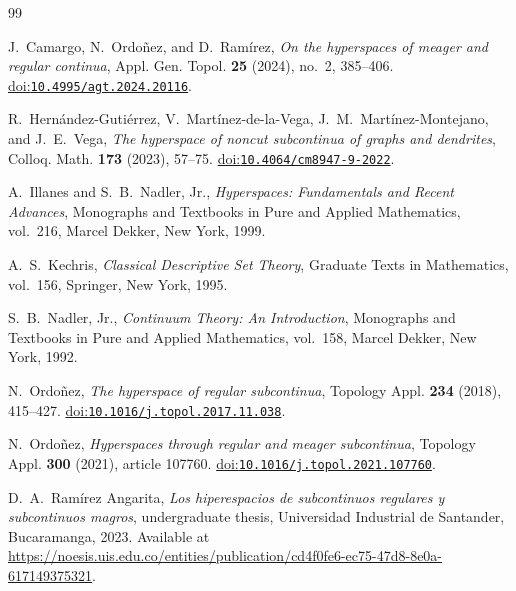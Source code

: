 \documentclass[11pt]{amsart}
\theoremstyle{definition}
\theoremstyle{remark}
\newcommand{\doi}[1]{\href{https://doi.org/#1}{doi:\nolinkurl{#1}}}
\begin{document}
\begin{thebibliography}{99}

J.~Camargo, N.~Ordo\~nez, and D.~Ram\'irez,
\emph{On the hyperspaces of meager and regular continua},
Appl. Gen. Topol. \textbf{25} (2024), no.~2, 385--406.
\doi{10.4995/agt.2024.20116}.

R.~Hern\'andez-Guti\'errez, V.~Mart\'inez-de-la-Vega, J.~M.~Mart\'inez-Montejano, and J.~E.~Vega,
\emph{The hyperspace of noncut subcontinua of graphs and dendrites},
Colloq. Math. \textbf{173} (2023), 57--75.
\doi{10.4064/cm8947-9-2022}.

A.~Illanes and S.~B.~Nadler, Jr.,
\emph{Hyperspaces: Fundamentals and Recent Advances},
Monographs and Textbooks in Pure and Applied Mathematics, vol.~216,
Marcel Dekker, New York, 1999.

A.~S.~Kechris,
\emph{Classical Descriptive Set Theory},
Graduate Texts in Mathematics, vol.~156, Springer, New York, 1995.

S.~B.~Nadler, Jr.,
\emph{Continuum Theory: An Introduction},
Monographs and Textbooks in Pure and Applied Mathematics, vol.~158,
Marcel Dekker, New York, 1992.

N.~Ordo\~nez,
\emph{The hyperspace of regular subcontinua},
Topology Appl. \textbf{234} (2018), 415--427.
\doi{10.1016/j.topol.2017.11.038}.

N.~Ordo\~nez,
\emph{Hyperspaces through regular and meager subcontinua},
Topology Appl. \textbf{300} (2021), article 107760.
\doi{10.1016/j.topol.2021.107760}.

D.~A.~Ram\'irez Angarita,
\emph{Los hiperespacios de subcontinuos regulares y subcontinuos magros},
undergraduate thesis, Universidad Industrial de Santander, Bucaramanga, 2023.
Available at \url{https://noesis.uis.edu.co/entities/publication/cd4f0fe6-ec75-47d8-8e0a-617149375321}.

\end{thebibliography}
\end{document}

